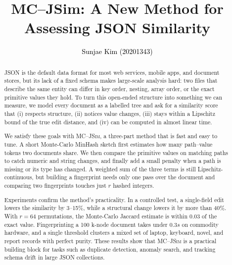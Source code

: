 \documentclass[sigconf]{acmart}
\begin{document}
\title{{MC–JSim: A New Method for Assessing JSON Similarity}}

\author{\textcolor{black}{Sunjae Kim (20201343)}}

\renewcommand{\shortauthors}{{Kim et al.}}

\begin{abstract}
JSON is the default data format for most web services, mobile apps, and document stores, but its lack of a fixed schema makes large-scale analysis hard: two files that describe the same entity can differ in key order, nesting, array order, or the exact primitive values they hold. To turn this open-ended structure into something we can measure, we model every document as a labelled tree and ask for a similarity score that (i) respects structure, (ii) notices value changes, (iii) stays within a Lipschitz bound of the true edit distance, and (iv) can be computed in almost linear time.

We satisfy these goals with \textsc{MC--JSim}, a three-part method that is fast and easy to tune. A short Monte-Carlo MinHash sketch first estimates how many path–value tokens two documents share. We then compare the primitive values on matching paths to catch numeric and string changes, and finally add a small penalty when a path is missing or its type has changed. A weighted sum of the three terms is still Lipschitz-continuous, but building a fingerprint needs only one pass over the document and comparing two fingerprints touches just $r$ hashed integers.

Experiments confirm the method’s practicality. In a controlled test, a single-field edit lowers the similarity by 3–15\%, while a structural change lowers it by more than 40\%. With $r=64$ permutations, the Monte-Carlo Jaccard estimate is within 0.03 of the exact value. Fingerprinting a 100 k-node document takes under $0.3s$ on commodity hardware, and a single threshold clusters a mixed set of laptop, keyboard, novel, and report records with perfect purity. These results show that \textsc{MC--JSim} is a practical building block for tasks such as duplicate detection, anomaly search, and tracking schema drift in large JSON collections.
\end{abstract}

\renewcommand\footnotetextcopyrightpermission[1]{} %
\end{document}
